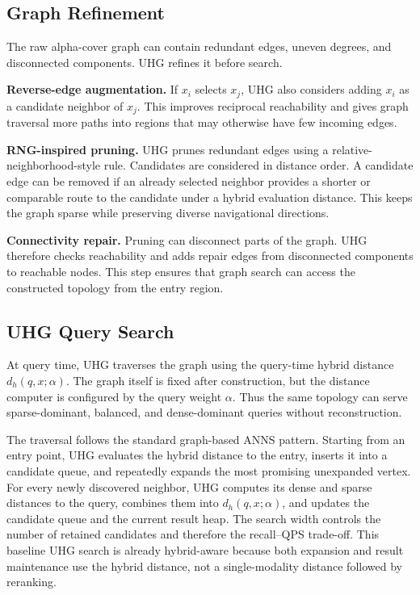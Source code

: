 \subsection{Graph Refinement}

The raw alpha-cover graph can contain redundant edges, uneven degrees, and disconnected components. UHG refines it before search.

\textbf{Reverse-edge augmentation.} If $x_i$ selects $x_j$, UHG also considers adding $x_i$ as a candidate neighbor of $x_j$. This improves reciprocal reachability and gives graph traversal more paths into regions that may otherwise have few incoming edges.

\textbf{RNG-inspired pruning.} UHG prunes redundant edges using a relative-neighborhood-style rule. Candidates are considered in distance order. A candidate edge can be removed if an already selected neighbor provides a shorter or comparable route to the candidate under a hybrid evaluation distance. This keeps the graph sparse while preserving diverse navigational directions.

\textbf{Connectivity repair.} Pruning can disconnect parts of the graph. UHG therefore checks reachability and adds repair edges from disconnected components to reachable nodes. This step ensures that graph search can access the constructed topology from the entry region.

\subsection{UHG Query Search}

At query time, UHG traverses the graph using the query-time hybrid distance $d_h(q,x;\alpha)$. The graph itself is fixed after construction, but the distance computer is configured by the query weight $\alpha$. Thus the same topology can serve sparse-dominant, balanced, and dense-dominant queries without reconstruction.

The traversal follows the standard graph-based ANNS pattern. Starting from an entry point, UHG evaluates the hybrid distance to the entry, inserts it into a candidate queue, and repeatedly expands the most promising unexpanded vertex. For every newly discovered neighbor, UHG computes its dense and sparse distances to the query, combines them into $d_h(q,x;\alpha)$, and updates the candidate queue and the current result heap. The search width controls the number of retained candidates and therefore the recall--QPS trade-off. This baseline UHG search is already hybrid-aware because both expansion and result maintenance use the hybrid distance, not a single-modality distance followed by reranking.

